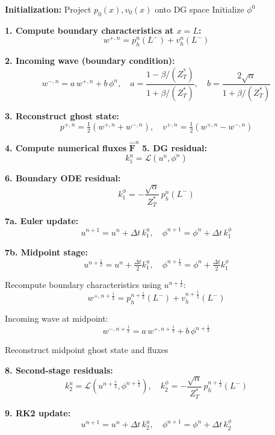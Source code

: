\documentclass[11pt,a4paper]{report}
\theoremstyle{plain}
\theoremstyle{definition}
\begin{document}
\begin{algorithm}[H]
\caption{DG scheme with boundary ODE at right boundary ($x=L$)}
\begin{algorithmic}[1]
\State \textbf{Initialization:}
\State \quad Project $p_0(x), v_0(x)$ onto DG space
\State \quad Initialize $\phi^0$


    \State \textbf{1. Compute boundary characteristics at $x=L$:}
    \[
        w^{+,n} = p_h^n(L^-) + v_h^n(L^-)
    \]

    \State \textbf{2. Incoming wave (boundary condition):}
    \[
        w^{-,n} = a\, w^{+,n} + b\, \phi^n,
    \quad
        a = \frac{1 - \beta/(Z^\ast_T)}{1 + \beta/(Z^\ast_T)},
    \quad
        b = \frac{2 \sqrt{\alpha}}{1 + \beta/(Z^\ast_T)}
    \]

    \State \textbf{3. Reconstruct ghost state:}
    \[
        p^{+,n} = \tfrac{1}{2}(w^{+,n} + w^{-,n}),
        \quad
        v^{+,n} = \tfrac{1}{2}(w^{+,n} - w^{-,n})
    \]

    \State \textbf{4. Compute numerical fluxes} $\hat{\mathbf F}^n$
    \State \textbf{5. DG residual:}
    \[
        k_1^u = \mathcal{L}(u^n,\phi^n)
    \]

    \State \textbf{6. Boundary ODE residual:}
    \[
        k_1^\phi = -\frac{\sqrt{\alpha}}{Z^\ast_T}\, p_h^n(L^-)
    \]


        \State \textbf{7a. Euler update:}
        \[
            u^{n+1} = u^n + \Delta t\, k_1^u,
            \quad
            \phi^{n+1} = \phi^n + \Delta t\, k_1^\phi
        \]

    \Else {}

        \State \textbf{7b. Midpoint stage:}
        \[
            u^{n+\frac12} = u^n + \tfrac{\Delta t}{2} k_1^u,
            \quad
            \phi^{n+\frac12} = \phi^n + \tfrac{\Delta t}{2} k_1^\phi
        \]

        \State Recompute boundary characteristics using $u^{n+\frac12}$:
        \[
            w^{+,n+\frac12} = p_h^{n+\frac12}(L^-) + v_h^{n+\frac12}(L^-)
        \]

        \State Incoming wave at midpoint:
        \[
            w^{-,n+\frac12} = a\, w^{+,n+\frac12} + b\, \phi^{n+\frac12}
        \]

        \State Reconstruct midpoint ghost state and fluxes

        \State \textbf{8. Second-stage residuals:}
        \[
            k_2^u = \mathcal{L}(u^{n+\frac12},\phi^{n+\frac12}),
            \quad
            k_2^\phi = -\frac{\sqrt{\alpha}}{Z^\ast_T}\,
            p_h^{n+\frac12}(L^-)
        \]

        \State \textbf{9. RK2 update:}
        \[
            u^{n+1} = u^n + \Delta t\, k_2^u,
            \quad
            \phi^{n+1} = \phi^n + \Delta t\, k_2^\phi
        \]

    \EndIf

\EndFor
\end{algorithmic}
\label{alg:dg_scheme_boundary_ode_rk2}
\end{algorithm}
\end{document}
